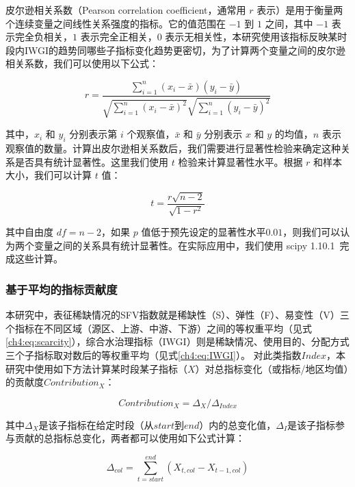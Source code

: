 皮尔逊相关系数（Pearson correlation coefficient，通常用 $r$ 表示）是用于衡量两个连续变量之间线性关系强度的指标。它的值范围在 $-1$ 到 $1$ 之间，其中 $-1$ 表示完全负相关，$1$ 表示完全正相关，$0$ 表示无相关性，本研究使用该指标反映某时段内IWGI的趋势同哪些子指标变化趋势更密切，为了计算两个变量之间的皮尔逊相关系数，我们可以使用以下公式\cite{freedman2007}：

\begin{equation}
    r = \frac{\sum_{i=1}^{n}(x_i - \bar{x})(y_i - \bar{y})}{\sqrt{\sum_{i=1}^{n}{(x_i - \bar{x})}^2}\sqrt{\sum_{i=1}^{n}{(y_i - \bar{y})}^2}}
\end{equation}

其中，$x_i$ 和 $y_i$ 分别表示第 $i$ 个观察值，$\bar{x}$ 和 $\bar{y}$ 分别表示 $x$ 和 $y$ 的均值，$n$ 表示观察值的数量。计算出皮尔逊相关系数后，我们需要进行显著性检验来确定这种关系是否具有统计显著性。这里我们使用 $t$ 检验来计算显著性水平。根据 $r$ 和样本大小，我们可以计算 $t$ 值\cite{freedman2007}：

\begin{equation}
    t = \frac{r\sqrt{n-2}}{\sqrt{1-r^2}}
\end{equation}

其中自由度 $df = n - 2$，如果 $p$ 值低于预先设定的显著性水平$0.01$，则我们可以认为两个变量之间的关系具有统计显著性。在实际应用中，我们使用 scipy 1.10.1~\cite{2020SciPy-NMeth}完成这些计算。

\subsubsection{基于平均的指标贡献度}

本研究中，表征稀缺情况的SFV指数就是稀缺性（S）、弹性（F）、易变性（V）三个指标在不同区域（源区、上游、中游、下游）之间的等权重平均（见式\ref{ch4:eq:scarcity}），综合水治理指标（IWGI）则是稀缺情况、使用目的、分配方式三个子指标取对数后的等权重平均（见式\ref{ch4:eq:IWGI}）。
对此类指数$Index$，本研究中使用如下方法计算某时段某子指标（$X$）对总指标变化（或指标/地区均值）的贡献度$Contribution_{X}$：

\begin{equation}
    Contribution_{X} = \Delta_{X} / \Delta_{Index}
\end{equation}

其中$\Delta_{X}$是该子指标在给定时段（从$start$到$end$）内的总变化值，$\Delta_{I}$是该子指标参与贡献的总指标总变化，两者都可以使用如下公式计算：

\begin{equation}
    \Delta_{col}=\sum_{t=start}^{end}(X_{t, col}-X_{t-1, col})
\end{equation}

